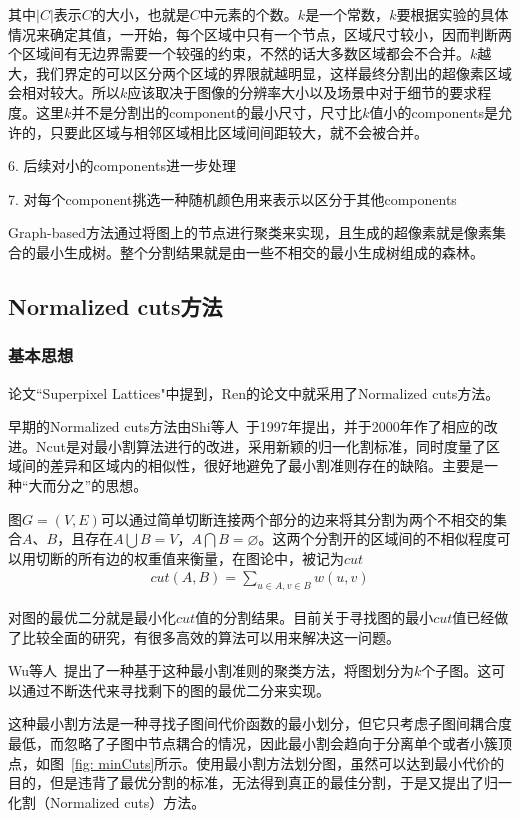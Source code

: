 \documentclass[12pt]{article}
\begin{document}
其中$|C|$表示$C$的大小，也就是$C$中元素的个数。$k$是一个常数，$k$要根据实验的具体情况来确定其值，一开始，每个区域中只有一个节点，区域尺寸较小，因而判断两个区域间有无边界需要一个较强的约束，不然的话大多数区域都会不合并。$k$越大，我们界定的可以区分两个区域的界限就越明显，这样最终分割出的超像素区域会相对较大。所以$k$应该取决于图像的分辨率大小以及场景中对于细节的要求程度。这里$k$并不是分割出的component的最小尺寸，尺寸比$k$值小的components是允许的，只要此区域与相邻区域相比区域间间距较大，就不会被合并。

6. 后续对小的components进一步处理

7. 对每个component挑选一种随机颜色用来表示以区分于其他components

Graph-based方法通过将图上的节点进行聚类来实现，且生成的超像素就是像素集合的最小生成树。整个分割结果就是由一些不相交的最小生成树组成的森林。

\subsection{Normalized cuts方法}

\subsubsection{基本思想}

论文“Superpixel Lattices"中提到，Ren的论文\cite{ren2003learning}中就采用了Normalized cuts方法。

早期的Normalized cuts方法由Shi等人~\cite{shi1997normalized}于1997年提出，并于2000年作了相应的改进\cite{shi2000normalized}。Ncut是对最小割算法进行的改进，采用新颖的归一化割标准，同时度量了区域间的差异和区域内的相似性，很好地避免了最小割准则存在的缺陷。主要是一种“大而分之”的思想。

图$G = (V, E)$可以通过简单切断连接两个部分的边来将其分割为两个不相交的集合$A$、$B$，且存在$A \bigcup B = V$，$A \bigcap B = \varnothing$。这两个分割开的区域间的不相似程度可以用切断的所有边的权重值来衡量，在图论中，被记为$cut$
\begin{align}
cut(A, B) = \sum_{u \in A, v \in B}w(u, v)
\end{align}

对图的最优二分就是最小化$cut$值的分割结果。目前关于寻找图的最小$cut$值已经做了比较全面的研究，有很多高效的算法可以用来解决这一问题。

Wu等人~\cite{wu1993optimal}提出了一种基于这种最小割准则的聚类方法，将图划分为$k$个子图。这可以通过不断迭代来寻找剩下的图的最优二分来实现。

这种最小割方法是一种寻找子图间代价函数的最小划分，但它只考虑子图间耦合度最低，而忽略了子图中节点耦合的情况，因此最小割会趋向于分离单个或者小簇顶点，如图~\ref{fig: minCuts}所示。使用最小割方法划分图，虽然可以达到最小代价的目的，但是违背了最优分割的标准，无法得到真正的最佳分割，于是又提出了归一化割（Normalized cuts）方法。
\end{document}
